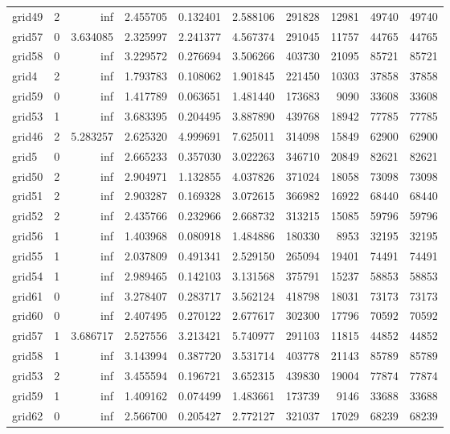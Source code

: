 \begin{longtable}{|l|r|r|r|r|r|r|r|r|r|}
grid49 & 2 & inf & 2.455705 & 0.132401 & 2.588106 & 291828 & 12981 & 49740 & 49740 \\
grid57 & 0 & 3.634085 & 2.325997 & 2.241377 & 4.567374 & 291045 & 11757 & 44765 & 44765 \\
grid58 & 0 & inf & 3.229572 & 0.276694 & 3.506266 & 403730 & 21095 & 85721 & 85721 \\
grid4 & 2 & inf & 1.793783 & 0.108062 & 1.901845 & 221450 & 10303 & 37858 & 37858 \\
grid59 & 0 & inf & 1.417789 & 0.063651 & 1.481440 & 173683 & 9090 & 33608 & 33608 \\
grid53 & 1 & inf & 3.683395 & 0.204495 & 3.887890 & 439768 & 18942 & 77785 & 77785 \\
grid46 & 2 & 5.283257 & 2.625320 & 4.999691 & 7.625011 & 314098 & 15849 & 62900 & 62900 \\
grid5 & 0 & inf & 2.665233 & 0.357030 & 3.022263 & 346710 & 20849 & 82621 & 82621 \\
grid50 & 2 & inf & 2.904971 & 1.132855 & 4.037826 & 371024 & 18058 & 73098 & 73098 \\
grid51 & 2 & inf & 2.903287 & 0.169328 & 3.072615 & 366982 & 16922 & 68440 & 68440 \\
grid52 & 2 & inf & 2.435766 & 0.232966 & 2.668732 & 313215 & 15085 & 59796 & 59796 \\
grid56 & 1 & inf & 1.403968 & 0.080918 & 1.484886 & 180330 & 8953 & 32195 & 32195 \\
grid55 & 1 & inf & 2.037809 & 0.491341 & 2.529150 & 265094 & 19401 & 74491 & 74491 \\
grid54 & 1 & inf & 2.989465 & 0.142103 & 3.131568 & 375791 & 15237 & 58853 & 58853 \\
grid61 & 0 & inf & 3.278407 & 0.283717 & 3.562124 & 418798 & 18031 & 73173 & 73173 \\
grid60 & 0 & inf & 2.407495 & 0.270122 & 2.677617 & 302300 & 17796 & 70592 & 70592 \\
grid57 & 1 & 3.686717 & 2.527556 & 3.213421 & 5.740977 & 291103 & 11815 & 44852 & 44852 \\
grid58 & 1 & inf & 3.143994 & 0.387720 & 3.531714 & 403778 & 21143 & 85789 & 85789 \\
grid53 & 2 & inf & 3.455594 & 0.196721 & 3.652315 & 439830 & 19004 & 77874 & 77874 \\
grid59 & 1 & inf & 1.409162 & 0.074499 & 1.483661 & 173739 & 9146 & 33688 & 33688 \\
grid62 & 0 & inf & 2.566700 & 0.205427 & 2.772127 & 321037 & 17029 & 68239 & 68239 \\

\end{longtable}
